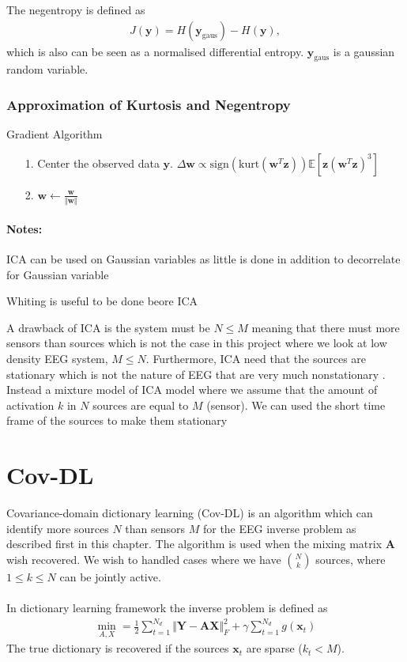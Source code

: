The negentropy is defined as 
\begin{align*}
J(\mathbf{y}) = H(\mathbf{y}_{\text{gaus}}) - H(\mathbf{y}),
\end{align*}
which is also can be seen as a normalised differential entropy. $\mathbf{y}_{\text{gaus}}$ is a gaussian random variable.

\subsubsection{Approximation of Kurtosis and Negentropy}


\begin{algorithm}[H]
\caption{Gradient Algorithm}
\begin{itemize}
\item[1.] Center the observed data $\mathbf{y}$. $\Delta \mathbf{w} \propto \text{sign}(\text{kurt}(\mathbf{w}^T \mathbf{z})) \mathbb{E}[\mathbf{z} (\mathbf{w}^T \mathbf{z})^3 ]$
\item[2.] $\mathbf{w} \leftarrow \frac{\mathbf{w}}{\Vert \mathbf{w} \Vert}$
\end{itemize}
\end{algorithm}

\paragraph{Notes:}
ICA can be used on Gaussian variables as little is done in addition to decorrelate for Gaussian variable

Whiting is useful to be done beore ICA

A drawback of ICA is the system must be $N \leq M$ meaning that there must more sensors than sources which is not the case in this project where we look at low density EEG system, $M \leq N$. Furthermore, ICA need that the sources are stationary which is not the nature of EEG that are very much nonstationary \cite[p. 7-8]{PHD}.
\\
Instead a mixture model of ICA model where we assume that the amount of activation $k$ in $N$ sources are equal to $M$ (sensor). We can used the short time frame of the sources to make them stationary

\section{Cov-DL}
Covariance-domain dictionary learning (Cov-DL) is an algorithm which can identify more sources $N$ than sensors $M$ for the EEG inverse problem as described first in this chapter. The algorithm is used when the mixing matrix $\mathbf{A}$ wish recovered. We wish to handled cases where we have $\binom{N}{k}$ sources, where $1 \leq k \leq N$ can be jointly active.
\\ \\
In dictionary learning framework the inverse problem is defined as
\begin{align*}
\min_{A,X} = \frac{1}{2} \sum_{t=1}^{N_d} \Vert \mathbf{Y} - \mathbf{AX} \Vert_F^2 + \gamma \sum_{t=1}^{N_d} g(\mathbf{x}_t)
\end{align*}
The true dictionary is recovered if the sources $\mathbf{x}_t$ are sparse ($k_t < M$).



